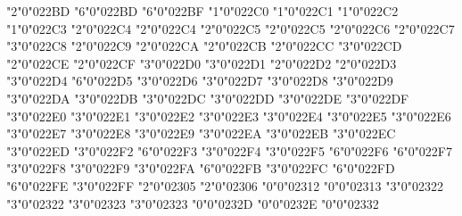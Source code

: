 \mchardef\barvee"2"0"022BD
\mchardef\barvee"6"0"022BD
\mchardef\varlrtriangle"6"0"022BF
\mchardef\bigwedge"1"0"022C0
\mchardef\bigvee"1"0"022C1
\mchardef\bigcap"1"0"022C2
\mchardef\bigcup"1"0"022C3
\mchardef\smwhtdiamond"2"0"022C4
\mchardef\diamond"2"0"022C4
\mchardef\cdot"2"0"022C5
\mchardef\tnyblkcircle"2"0"022C5
\let\cdot\tnyblkcircle
\mchardef\star"2"0"022C6
\mchardef\divideontimes"2"0"022C7
\mchardef\bowtie"3"0"022C8
\mchardef\ltimes"2"0"022C9
\mchardef\rtimes"2"0"022CA
\mchardef\leftthreetimes"2"0"022CB
\mchardef\rightthreetimes"2"0"022CC
\mchardef\backsimeq"3"0"022CD
\mchardef\curlyvee"2"0"022CE
\mchardef\curlywedge"2"0"022CF
\mchardef\Subset"3"0"022D0
\mchardef\Supset"3"0"022D1
\mchardef\Cap"2"0"022D2
\mchardef\Cup"2"0"022D3
\mchardef\pitchfork"3"0"022D4
\mchardef\equalparallel"6"0"022D5
\mchardef\lessdot"3"0"022D6
\mchardef\gtrdot"3"0"022D7
\mchardef\lll"3"0"022D8
\mchardef\ggg"3"0"022D9
\mchardef\lesseqgtr"3"0"022DA
\mchardef\gtreqless"3"0"022DB
\mchardef\eqless"3"0"022DC
\mchardef\eqgtr"3"0"022DD
\mchardef\curlyeqprec"3"0"022DE
\mchardef\curlyeqsucc"3"0"022DF
\mchardef\npreccurlyeq"3"0"022E0
\mchardef\nsucccurlyeq"3"0"022E1
\mchardef\nsqsubseteq"3"0"022E2
\mchardef\nsqsupseteq"3"0"022E3
\mchardef\sqsubsetneq"3"0"022E4
\mchardef\sqsupsetneq"3"0"022E5
\mchardef\lnsim"3"0"022E6
\mchardef\gnsim"3"0"022E7
\mchardef\precnsim"3"0"022E8
\mchardef\succnsim"3"0"022E9
\mchardef\ntriangleleft"3"0"022EA
\mchardef\ntriangleright"3"0"022EB
\mchardef\ntrianglelefteq"3"0"022EC
\mchardef\ntrianglerighteq"3"0"022ED
\mchardef\disin"3"0"022F2
\mchardef\varisins"6"0"022F3
\mchardef\isins"3"0"022F4
\mchardef\isindot"3"0"022F5
\mchardef\varisinobar"6"0"022F6
\mchardef\isinobar"6"0"022F7
\mchardef\isinvb"3"0"022F8
\mchardef\isinE"3"0"022F9
\mchardef\nisd"3"0"022FA
\mchardef\varnis"6"0"022FB
\mchardef\nis"3"0"022FC
\mchardef\varniobar"6"0"022FD
\mchardef\niobar"6"0"022FE
\mchardef\bagmember"3"0"022FF
\mchardef\varbarwedge"2"0"02305
\mchardef\vardoublebarwedge"2"0"02306
\def\lceil{\delim"4"0"02308 }
\def\rceil{\delim"5"0"02309 }
\def\lfloor{\delim"4"0"0230A }
\def\rfloor{\delim"5"0"0230B }
\def\drcrop{\delim"0"0"0230C }
\def\dlcrop{\delim"0"0"0230D }
\def\urcrop{\delim"0"0"0230E }
\def\ulcrop{\delim"0"0"0230F }
\mchardef\profline"0"0"02312
\mchardef\profsurf"0"0"02313
\def\ulcorner{\delim"4"0"0231C }
\def\urcorner{\delim"5"0"0231D }
\def\llcorner{\delim"4"0"0231E }
\def\lrcorner{\delim"5"0"0231F }
\mchardef\frown"3"0"02322
\mchardef\smallfrown"3"0"02322
\mchardef\smile"3"0"02323
\mchardef\smallsmile"3"0"02323
\mchardef\cylcty"0"0"0232D
\mchardef\profalar"0"0"0232E
\mchardef\conictaper"0"0"02332
